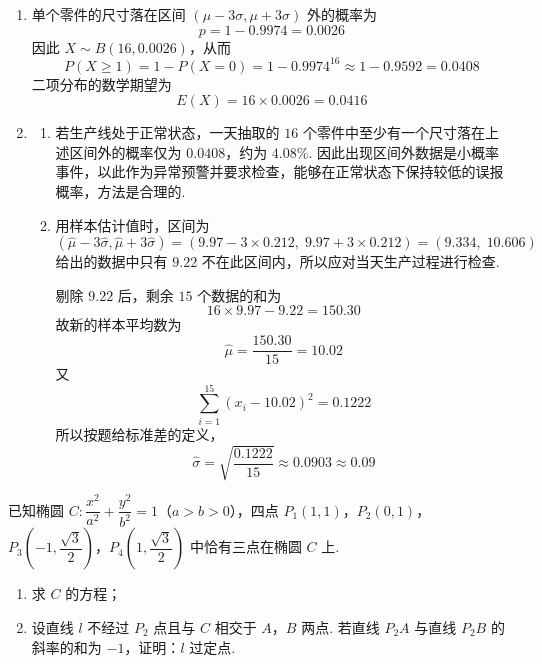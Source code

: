 \begin{solution}
\begin{enumerate}
\item 单个零件的尺寸落在区间 \((\mu-3\sigma,\mu+3\sigma)\) 外的概率为
\[
p=1-0.9974=0.0026
\]
因此 \(X\sim B(16,0.0026)\)，从而
\[
P(X\ge1)=1-P(X=0)=1-0.9974^{16}\approx1-0.9592=0.0408
\]
二项分布的数学期望为
\[
E(X)=16\times0.0026=0.0416
\]

\item
\begin{enumerate}
\item 若生产线处于正常状态，一天抽取的 \(16\) 个零件中至少有一个尺寸落在上述区间外的概率仅为 \(0.0408\)，约为 \(4.08\%\). 因此出现区间外数据是小概率事件，以此作为异常预警并要求检查，能够在正常状态下保持较低的误报概率，方法是合理的.

\item 用样本估计值时，区间为
\[
(\hat\mu-3\hat\sigma,\hat\mu+3\hat\sigma)
=(9.97-3\times0.212,\;9.97+3\times0.212)
=(9.334,\;10.606)
\]
给出的数据中只有 \(9.22\) 不在此区间内，所以应对当天生产过程进行检查.

剔除 \(9.22\) 后，剩余 \(15\) 个数据的和为
\[
16\times9.97-9.22=150.30
\]
故新的样本平均数为
\[
\hat\mu=\frac{150.30}{15}=10.02
\]
又
\[
\sum_{i=1}^{15}(x_i-10.02)^2=0.1222
\]
所以按题给标准差的定义，
\[
\hat\sigma=\sqrt{\frac{0.1222}{15}}\approx0.0903\approx0.09
\]
\end{enumerate}
\end{enumerate}
\end{solution}

\begin{problem}
已知椭圆 \(C:\dfrac{x^2}{a^2}+\dfrac{y^2}{b^2}=1\)（\(a>b>0\)），四点 \(P_1(1,1)\)，\(P_2(0,1)\)，\(P_3\left(-1,\dfrac{\sqrt3}{2}\right)\)，\(P_4\left(1,\dfrac{\sqrt3}{2}\right)\) 中恰有三点在椭圆 \(C\) 上.

\begin{enumerate}
\item 求 \(C\) 的方程；
\item 设直线 \(l\) 不经过 \(P_2\) 点且与 \(C\) 相交于 \(A\)，\(B\) 两点. 若直线 \(P_2A\) 与直线 \(P_2B\) 的斜率的和为 \(-1\)，证明：\(l\) 过定点.
\end{enumerate}
\end{problem}

